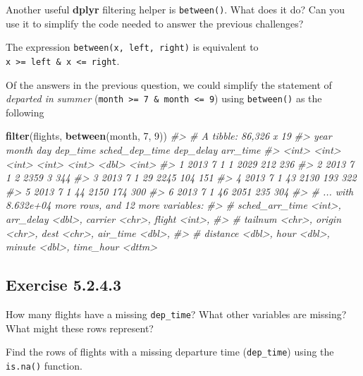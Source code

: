 \documentclass[]{book}
\newenvironment{Shaded}{\begin{snugshade}}{\end{snugshade}}
\newcommand{\CommentTok}[1]{\textcolor[rgb]{0.56,0.35,0.01}{\textit{#1}}}
\newcommand{\DecValTok}[1]{\textcolor[rgb]{0.00,0.00,0.81}{#1}}
\newcommand{\KeywordTok}[1]{\textcolor[rgb]{0.13,0.29,0.53}{\textbf{#1}}}
\newcommand{\NormalTok}[1]{#1}
\theoremstyle{plain}
\theoremstyle{remark}
\begin{document}
Another useful \textbf{dplyr} filtering helper is \texttt{between()}. What does it do? Can you use it to simplify the code needed to answer the previous challenges?

The expression \texttt{between(x,\ left,\ right)} is equivalent to \texttt{x\ \textgreater{}=\ left\ \&\ x\ \textless{}=\ right}.

Of the answers in the previous question, we could simplify the statement of \emph{departed in summer} (\texttt{month\ \textgreater{}=\ 7\ \&\ month\ \textless{}=\ 9}) using \texttt{between()} as the following

\begin{Shaded}
\begin{Highlighting}[]
\KeywordTok{filter}\NormalTok{(flights, }\KeywordTok{between}\NormalTok{(month, }\DecValTok{7}\NormalTok{, }\DecValTok{9}\NormalTok{))}
\CommentTok{#> # A tibble: 86,326 x 19}
\CommentTok{#>    year month   day dep_time sched_dep_time dep_delay arr_time}
\CommentTok{#>   <int> <int> <int>    <int>          <int>     <dbl>    <int>}
\CommentTok{#> 1  2013     7     1        1           2029       212      236}
\CommentTok{#> 2  2013     7     1        2           2359         3      344}
\CommentTok{#> 3  2013     7     1       29           2245       104      151}
\CommentTok{#> 4  2013     7     1       43           2130       193      322}
\CommentTok{#> 5  2013     7     1       44           2150       174      300}
\CommentTok{#> 6  2013     7     1       46           2051       235      304}
\CommentTok{#> # ... with 8.632e+04 more rows, and 12 more variables:}
\CommentTok{#> #   sched_arr_time <int>, arr_delay <dbl>, carrier <chr>, flight <int>,}
\CommentTok{#> #   tailnum <chr>, origin <chr>, dest <chr>, air_time <dbl>,}
\CommentTok{#> #   distance <dbl>, hour <dbl>, minute <dbl>, time_hour <dttm>}
\end{Highlighting}
\end{Shaded}

\hypertarget{exercise-5.2.4.3}{%
\subsection*{\texorpdfstring{Exercise {5.2.4.3}}{Exercise 5.2.4.3}}\label{exercise-5.2.4.3}}

How many flights have a missing \texttt{dep\_time}? What other variables are missing? What might these rows represent?

Find the rows of flights with a missing departure time (\texttt{dep\_time}) using the \texttt{is.na()} function.
\end{document}
